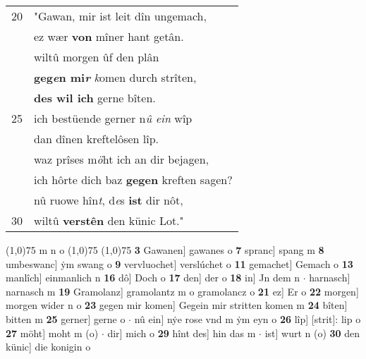 \documentclass[8pt,a4paper,notitlepage]{article}
\begin{document}
\begin{table}[ht]
\begin{minipage}[t]{0.5\linewidth}
\begin{tabular}{rl}
20 & "Gawan, mir ist leit dîn ungemach,\\ 
 & ez wær \textbf{von} mîner hant getân.\\ 
 & wiltû morgen ûf den plân\\ 
 & \textbf{geg\textit{e}n mi\textit{r}} \textit{k}omen durch strîten,\\ 
 & \textbf{des wil ich} gerne bîten.\\ 
25 & ich bestüende gerner n\textit{û ein} wîp\\ 
 & dan dînen kreftelôsen lîp.\\ 
 & waz prîses m\textit{ö}ht ich an dir bejagen,\\ 
 & ich hôrte dich baz \textbf{gegen} kreften sagen?\\ 
 & nû ruowe hîn\textit{t}, d\textit{e}s \textbf{ist} dir nôt,\\ 
30 & wiltû \textbf{verstên} den künic Lot."\\ 
\end{tabular}
\scriptsize
\line(1,0){75} \newline
m n o \newline
\line(1,0){75} \newline
\newline
\line(1,0){75} \newline
\textbf{3} Gawanen] gawanes o \textbf{7} spranc] spang m \textbf{8} umbeswanc] ẏm swang o \textbf{9} vervluochet] verslúchet o \textbf{11} gemachet] Gemach o \textbf{13} manlîch] einmanlich n \textbf{16} dô] Doch o \textbf{17} den] der o \textbf{18} in] Jn dem n  $\cdot$ harnasch] narnasch m \textbf{19} Gramolanz] gramolantz m o gramolancz o \textbf{21} ez] Er o \textbf{22} morgen] morgen wider n o \textbf{23} gegen mir komen] Gegein mir stritten komen m \textbf{24} bîten] bitten m \textbf{25} gerner] gerne o  $\cdot$ nû ein] nẏe rose vnd m ẏm eyn o \textbf{26} lîp] [strit]: lip o \textbf{27} möht] moht m (o)  $\cdot$ dir] mich o \textbf{29} hînt des] hin das m  $\cdot$ ist] wurt n (o) \textbf{30} den künic] die konigin o \newline
\end{minipage}
\end{table}
\newpage
\end{document}
